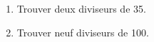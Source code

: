 \documentclass[exercice]{thedocument}%
\begin{document}
%
\begin{enumerate}
    \item Trouver deux diviseurs de 35.
    \item Trouver neuf diviseurs de 100.
\end{enumerate}
\end{document}
